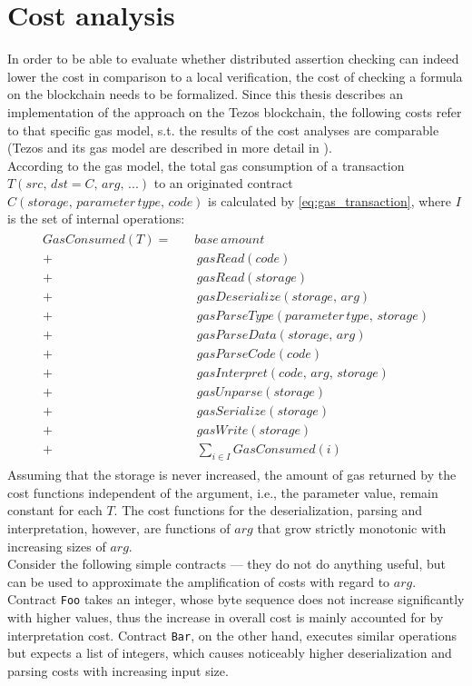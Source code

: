 \section{Cost analysis}\label{sec:usecase_cost}
In order to be able to evaluate whether distributed assertion checking can indeed lower the cost in comparison to a local verification, the cost of checking a formula on the blockchain needs to be formalized. Since this thesis describes an implementation of the approach on the Tezos blockchain, the following costs refer to that specific gas model, s.t. the results of the cost analyses are comparable (Tezos and its gas model are described in more detail in ). \\
According to the gas model, the total gas consumption of a transaction $T(src,\, dst=C,\, arg, \, ...)$ to an originated contract $C(storage, \, parameter\, type, \, code)$ is calculated by \eqref{eq:gas_transaction}, where $I$ is the set of internal operations:
\begin{align}\label{eq:gas_transaction}
\begin{split}
GasConsumed(T) = \quad &base \, amount \\
+& \, gasRead(code) \\
+& \, gasRead(storage) \\
+& \, gasDeserialize(storage, \, arg) \\
+& \, gasParseType(parameter \, type, \, storage) \\
+& \, gasParseData(storage, \, arg) \\
+& \, gasParseCode(code) \\
+& \, gasInterpret(code, \, arg, \, storage) \\
+& \, gasUnparse(storage) \\
+& \, gasSerialize(storage) \\
+& \, gasWrite(storage) \\
+& \, \sum_{i \in I} GasConsumed(i)
\end{split}
\end{align}
Assuming that the storage is never increased, the amount of gas returned by the cost functions independent of the argument, i.e., the parameter value, remain constant for each $T$. The cost functions for the deserialization, parsing and interpretation, however, are functions of $arg$ that grow strictly monotonic with increasing sizes of $arg$. \\
Consider the following simple contracts --- they do not do anything useful, but can be used to approximate the amplification of costs with regard to $arg$. Contract \texttt{Foo} takes an integer, whose byte sequence does not increase significantly with higher values, thus the increase in overall cost is mainly accounted for by interpretation cost. Contract \texttt{Bar}, on the other hand, executes similar operations but expects a list of integers, which causes noticeably higher deserialization and parsing costs with increasing input size. 
